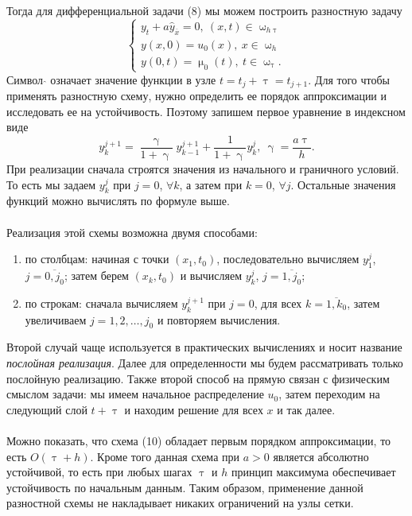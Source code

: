 \documentclass[a4paper, 12pt]{report}
\numberwithin{equation}{section}
\newcommand{\ol}{\overline}
\renewcommand{\gamma}{\upgamma}
\renewcommand{\tau}{\uptau}
\renewcommand{\mu}{\upmu}
\renewcommand{\omega}{\upomega}
\begin{document}
 Тогда для дифференциальной задачи (8) мы можем построить разностную задачу
 \begin{equation}
	 	\begin{cases}
	 		y_t + a \hat y_{\ol x} =0,\ (x,t)\in \omega_{h\tau}\\
	 	y(x,0) = u_0(x),\ x \in \omega_h\\
	 	y(0,t) = \mu_0(t),\ t \in \omega_\tau.
	 	\end{cases}
 \end{equation}
 Символ $\hat{}$ означает значение функции в узле $t = t_j + \tau = t_{j+1}$. Для того чтобы применять разностную схему, нужно определить ее порядок аппроксимации и исследовать ее на устойчивость. Поэтому запишем первое уравнение в индексном виде
 $$y_{k}^{j+1} = \dfrac{\gamma}{1+ \gamma} y_{k-1}^{j+1} + \dfrac{1}{1+\gamma}y_k^j,\ \gamma = \dfrac{a\tau}{h}.$$
 При реализации сначала строятся значения из начального и граничного условий. То есть мы задаем $y_k^j$ при $j = 0$, $\forall k$, а затем при $k=0$, $\forall j$. Остальные значения функций можно вычислять по формуле выше. \\\\
 Реализация этой схемы возможна двумя способами:
 \begin{enumerate}
	 	\item по столбцам: начиная с точки $(x_1,t_0)$, последовательно вычисляем $y_1^j$, $j = \overline{0, j_0}$; затем берем $(x_k, t_0)$ и вычисляем $y_k^j$, $j = \ol{1,j_0}$;
	 	\item по строкам: сначала вычисляем $y_k^{j+1}$ при $j=0$, для всех $k = \ol{1, k_0}$, затем увеличиваем $j = 1,2,\ldots, j_0$ и повторяем вычисления.
 \end{enumerate}
 Второй случай чаще используется в практических вычислениях и носит название \textit{послойная реализация}. Далее для определенности мы будем рассматривать только послойную реализацию. Также второй способ на прямую связан с физическим смыслом задачи: мы имеем начальное распределение $u_0$, затем переходим на следующий слой $t+\tau$ и находим решение для всех $x$ и так далее.\\\\
 Можно показать, что схема (10) обладает первым порядком аппроксимации, то есть $O(\tau + h)$. Кроме того данная схема при $a>0$ является абсолютно устойчивой, то есть при любых шагах $\tau$ и $h$ принцип максимума обеспечивает устойчивость по начальным данным. Таким образом, применение данной разностной схемы не накладывает никаких ограничений на узлы сетки.\\\\
\end{document}
